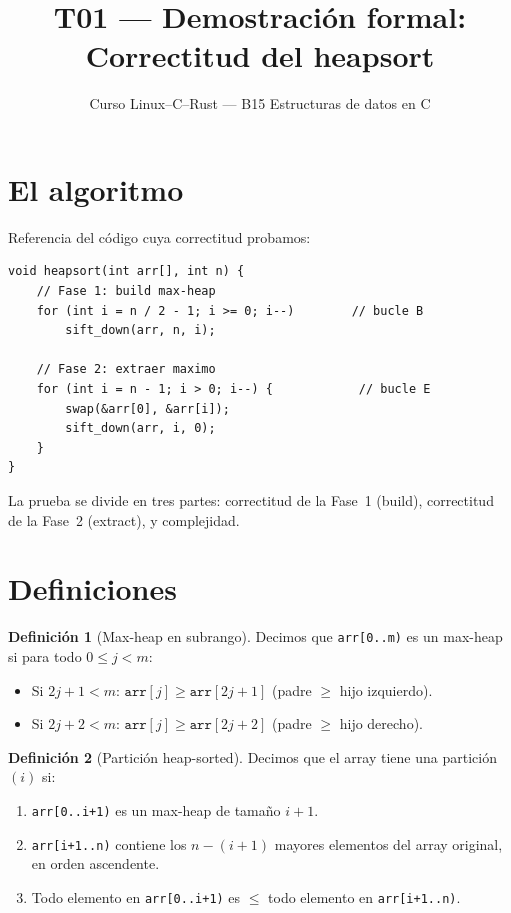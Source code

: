 \documentclass[11pt, letterpaper]{article}
\title{%
  T01 --- Demostración formal:\\[4pt]
  Correctitud del heapsort
}
\author{Curso Linux--C--Rust --- B15 Estructuras de datos en C}
\date{}
\theoremstyle{definition}
\newtheorem{definition}{Definición}[section]
\theoremstyle{plain}
\theoremstyle{remark}
\begin{document}
\maketitle
\tableofcontents

\section{El algoritmo}

Referencia del código cuya correctitud probamos:

\begin{lstlisting}
void heapsort(int arr[], int n) {
    // Fase 1: build max-heap
    for (int i = n / 2 - 1; i >= 0; i--)        // bucle B
        sift_down(arr, n, i);

    // Fase 2: extraer maximo
    for (int i = n - 1; i > 0; i--) {            // bucle E
        swap(&arr[0], &arr[i]);
        sift_down(arr, i, 0);
    }
}
\end{lstlisting}

La prueba se divide en tres partes: correctitud de la Fase~1 (build),
correctitud de la Fase~2 (extract), y complejidad.

\section{Definiciones}

\begin{definition}[Max-heap en subrango]
Decimos que \texttt{arr[0..m)} es un max-heap si para todo
$0 \leq j < m$:
\begin{itemize}
  \item Si $2j+1 < m$: $\texttt{arr}[j] \geq \texttt{arr}[2j+1]$
    \quad (padre $\geq$ hijo izquierdo).
  \item Si $2j+2 < m$: $\texttt{arr}[j] \geq \texttt{arr}[2j+2]$
    \quad (padre $\geq$ hijo derecho).
\end{itemize}
\end{definition}

\begin{definition}[Partición heap-sorted]
Decimos que el array tiene una partición~$(i)$ si:
\begin{enumerate}
  \item[\textbf{P1.}] \texttt{arr[0..i+1)} es un max-heap de tamaño
    $i+1$.
  \item[\textbf{P2.}] \texttt{arr[i+1..n)} contiene los $n-(i+1)$
    mayores elementos del array original, en orden ascendente.
  \item[\textbf{P3.}] Todo elemento en \texttt{arr[0..i+1)} es $\leq$
    todo elemento en \texttt{arr[i+1..n)}.
\end{enumerate}
\end{definition}
\end{document}
